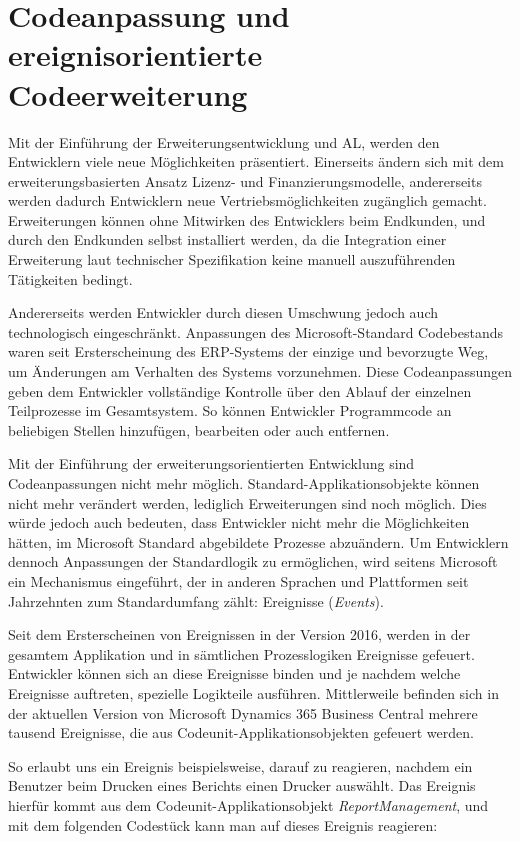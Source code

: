 \section{Codeanpassung und ereignisorientierte Codeerweiterung}
Mit der Einführung der Erweiterungsentwicklung und AL, werden den Entwicklern viele neue Möglichkeiten präsentiert. Einerseits ändern sich mit dem erweiterungsbasierten Ansatz Lizenz- und Finanzierungsmodelle, andererseits werden dadurch Entwicklern neue Vertriebsmöglichkeiten zugänglich gemacht. Erweiterungen können ohne Mitwirken des Entwicklers beim Endkunden, und durch den Endkunden selbst installiert werden, da die Integration einer Erweiterung laut technischer Spezifikation keine manuell auszuführenden Tätigkeiten bedingt.

Andererseits werden Entwickler durch diesen Umschwung jedoch auch technologisch eingeschränkt. Anpassungen des Microsoft-Standard Codebestands waren seit Ersterscheinung des ERP-Systems der einzige und bevorzugte Weg, um Änderungen am Verhalten des Systems vorzunehmen. Diese Codeanpassungen geben dem Entwickler vollständige Kontrolle über den Ablauf der einzelnen Teilprozesse im Gesamtsystem. So können Entwickler Programmcode an beliebigen Stellen hinzufügen, bearbeiten oder auch entfernen.

Mit der Einführung der erweiterungsorientierten Entwicklung sind Codeanpassungen nicht mehr möglich. Standard-Applikationsobjekte können nicht mehr verändert werden, lediglich Erweiterungen sind noch möglich. Dies würde jedoch auch bedeuten, dass Entwickler nicht mehr die Möglichkeiten hätten, im Microsoft Standard abgebildete Prozesse abzuändern. Um Entwicklern dennoch Anpassungen der Standardlogik zu ermöglichen, wird seitens Microsoft ein Mechanismus eingeführt, der in anderen Sprachen und Plattformen seit Jahrzehnten zum Standardumfang zählt: Ereignisse (\textit{Events}).

Seit dem Ersterscheinen von Ereignissen in der Version 2016, werden in der gesamtem Applikation und in sämtlichen Prozesslogiken Ereignisse gefeuert. Entwickler können sich an diese Ereignisse binden und je nachdem welche Ereignisse auftreten, spezielle Logikteile ausführen. Mittlerweile befinden sich in der aktuellen Version von Microsoft Dynamics 365 Business Central mehrere tausend Ereignisse, die aus Codeunit-Applikationsobjekten gefeuert werden.

So erlaubt uns ein Ereignis beispielsweise, darauf zu reagieren, nachdem ein Benutzer beim Drucken eines Berichts einen Drucker auswählt. Das Ereignis hierfür kommt aus dem Codeunit-Applikationsobjekt \textit{ReportManagement}, und mit dem folgenden Codestück kann man auf dieses Ereignis reagieren: 

